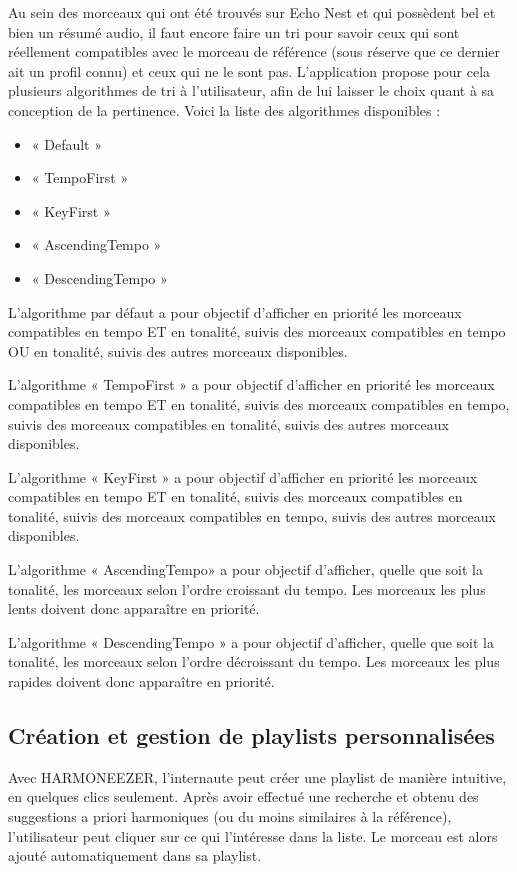 \documentclass[a4paper,12pt]{article}
\begin{document}
Au sein des morceaux qui ont été trouvés sur Echo Nest et qui possèdent bel et bien un résumé audio, il faut encore faire un tri pour savoir ceux qui sont réellement compatibles avec le morceau de référence (sous réserve que ce dernier ait un profil connu) et ceux qui ne le sont pas. L'application propose pour cela plusieurs algorithmes de tri à l'utilisateur, afin de lui laisser le choix quant à sa conception de la pertinence. Voici la liste des algorithmes disponibles :

\begin{itemize}
 \item{« Default »}
 \item{« TempoFirst »}
 \item{« KeyFirst »}
 \item{« AscendingTempo »}
 \item{« DescendingTempo »}
\end{itemize}

L'algorithme par défaut a pour objectif d'afficher en priorité les morceaux compatibles en tempo ET en tonalité, suivis des morceaux compatibles en tempo OU en tonalité, suivis des autres morceaux disponibles.

L'algorithme « TempoFirst » a pour objectif d'afficher en priorité les morceaux compatibles en tempo ET en tonalité, suivis des morceaux compatibles en tempo, suivis des morceaux compatibles en tonalité, suivis des autres morceaux disponibles.

L'algorithme « KeyFirst » a pour objectif d'afficher en priorité les morceaux compatibles en tempo ET en tonalité, suivis des morceaux compatibles en tonalité, suivis des morceaux compatibles en tempo, suivis des autres morceaux disponibles.

L'algorithme « AscendingTempo» a pour objectif d'afficher, quelle que soit la tonalité, les morceaux selon l'ordre croissant du tempo. Les morceaux les plus lents doivent donc apparaître en priorité.

L'algorithme « DescendingTempo » a pour objectif d'afficher, quelle que soit la tonalité, les morceaux selon l'ordre décroissant du tempo. Les morceaux les plus rapides doivent donc apparaître en priorité.

\subsection{Création et gestion de playlists personnalisées}

Avec HARMONEEZER, l'internaute peut créer une playlist de manière intuitive, en quelques clics seulement. Après avoir effectué une recherche et obtenu des suggestions a priori harmoniques (ou du moins similaires à la référence), l'utilisateur peut cliquer sur ce qui l'intéresse dans la liste. Le morceau est alors ajouté automatiquement dans sa playlist.
\end{document}
